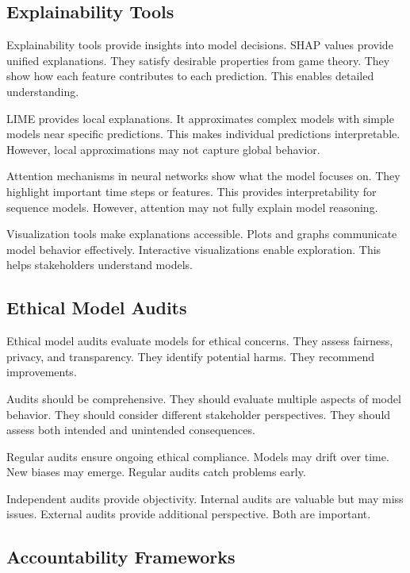 \subsection{Explainability Tools}

Explainability tools provide insights into model decisions. SHAP values provide unified explanations. They satisfy desirable properties from game theory. They show how each feature contributes to each prediction. This enables detailed understanding.

LIME provides local explanations. It approximates complex models with simple models near specific predictions. This makes individual predictions interpretable. However, local approximations may not capture global behavior.

Attention mechanisms in neural networks show what the model focuses on. They highlight important time steps or features. This provides interpretability for sequence models. However, attention may not fully explain model reasoning.

Visualization tools make explanations accessible. Plots and graphs communicate model behavior effectively. Interactive visualizations enable exploration. This helps stakeholders understand models.

\subsection{Ethical Model Audits}

Ethical model audits evaluate models for ethical concerns. They assess fairness, privacy, and transparency. They identify potential harms. They recommend improvements.

Audits should be comprehensive. They should evaluate multiple aspects of model behavior. They should consider different stakeholder perspectives. They should assess both intended and unintended consequences.

Regular audits ensure ongoing ethical compliance. Models may drift over time. New biases may emerge. Regular audits catch problems early.

Independent audits provide objectivity. Internal audits are valuable but may miss issues. External audits provide additional perspective. Both are important.

\subsection{Accountability Frameworks}

